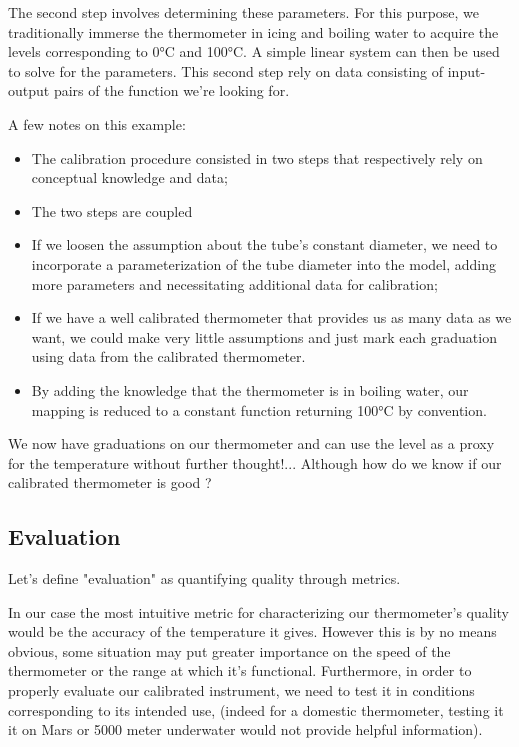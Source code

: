 \begin{bibunit}
The second step involves determining these parameters. For this purpose, we traditionally immerse the thermometer in icing and boiling water to acquire the levels corresponding to 0°C and 100°C. A simple linear system can then be used to solve for the parameters.
This second step rely on data consisting of input-output pairs of the function we're looking for. 

A few notes on this example:
\begin{itemize}
\item The calibration procedure consisted in two steps that respectively rely on conceptual knowledge and data;
\item The two steps are coupled
\item If we loosen the assumption about the tube's constant diameter, we need to incorporate a parameterization of the tube diameter into the model, adding more parameters and necessitating additional data for calibration;
\item If we have a well calibrated thermometer that provides us as many data as we want, we could make very little assumptions and just mark each graduation using data from the calibrated thermometer.
\item By adding the knowledge that the thermometer is in boiling water, our mapping is reduced to a constant function returning 100°C by convention.
  \end{itemize}

We now have graduations on our thermometer and can use the level as a proxy for the temperature without further thought!... Although how do we know if our calibrated thermometer is good ? 


\subsection{Evaluation}

Let's define "evaluation" as quantifying quality through metrics.

In our case the most intuitive metric for characterizing our thermometer's quality would be the accuracy of the temperature it gives. However this is by no means obvious, some situation may put greater importance on the speed of the thermometer or the range at which it's functional. 
  Furthermore, in order to properly evaluate our calibrated instrument, we need to test it in conditions corresponding to its intended use, (indeed for a domestic thermometer, testing it it on Mars or 5000 meter underwater would not provide helpful information).


\end{bibunit}
